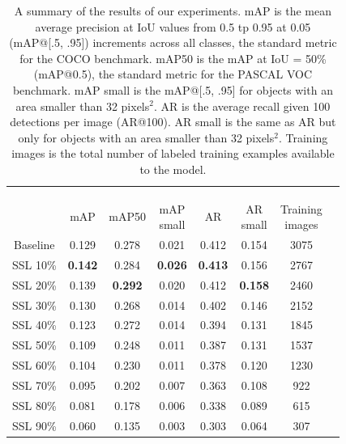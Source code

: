 \documentclass[conference]{IEEEtran}
\begin{document}
\begin{table}[h]
\renewcommand{\arraystretch}{1.3}
\caption{A summary of the results of our experiments. mAP is the mean average precision at IoU values from 0.5 tp 0.95 at 0.05 (mAP@[.5, .95]) increments across all classes, the standard metric for the COCO benchmark. mAP50 is the mAP at IoU = 50\% (mAP@0.5), the standard metric for the PASCAL VOC benchmark. mAP small is the mAP@[.5, .95] for objects with an area smaller than 32 pixels$^2$. AR is the average recall given 100 detections per image (AR@100). AR small is the same as AR but only for objects with an area smaller than 32 pixels$^2$. Training images is the total number of labeled training examples available to the model.}
\label{tab:results}
\centering
\begin{tabular}{|c|c|c|c|c|c|c|c}
\hline
\begin{minipage}{5mm} ~\\ \\ \\ \end{minipage} & mAP & mAP50 & \parbox[c]{7mm}{mAP\\small} & AR & \parbox[c]{7mm}{AR\\small} & \parbox[c]{9mm}{Training\\images} \\ \hline \hline
{}
Baseline & 0.129 & 0.278 & 0.021 & 0.412 & 0.154 & 3075 \\ \hline
SSL 10\% & \textbf{0.142} & 0.284 & \textbf{0.026} & \textbf{0.413} & 0.156 & 2767 \\ \hline
SSL 20\% & 0.139 & \textbf{0.292} & 0.020 & 0.412 & \textbf{0.158} & 2460 \\ \hline
SSL 30\% & 0.130 & 0.268 & 0.014 & 0.402 & 0.146 & 2152 \\ \hline
SSL 40\% & 0.123 & 0.272 & 0.014 & 0.394 & 0.131 & 1845 \\ \hline
{}
SSL 50\% & 0.109 & 0.248 & 0.011 & 0.387 & 0.131 & 1537 \\ \hline
SSL 60\% & 0.104 & 0.230 & 0.011 & 0.378 & 0.120 & 1230 \\ \hline
SSL 70\% & 0.095 & 0.202 & 0.007 & 0.363 & 0.108 & 922 \\ \hline
SSL 80\% & 0.081 & 0.178 & 0.006 & 0.338 & 0.089 & 615 \\ \hline
SSL 90\% & 0.060 & 0.135 & 0.003 & 0.303 & 0.064 & 307 \\
\hline
\end{tabular}
\end{table}
\end{document}
